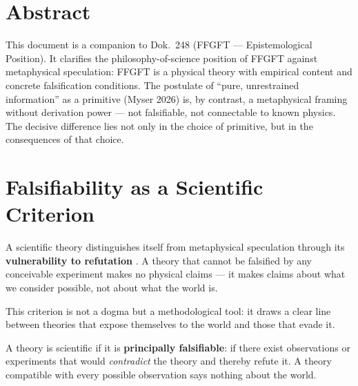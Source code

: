 
\section*{Abstract}

This document is a companion to Dok.~248 (FFGFT --- Epistemological Position). It clarifies the philosophy-of-science position of FFGFT against metaphysical speculation: FFGFT is a physical theory with empirical content and concrete falsification conditions. The postulate of ``pure, unrestrained information'' as a primitive (Myser 2026) is, by contrast, a metaphysical framing without derivation power --- not falsifiable, not connectable to known physics. The decisive difference lies not only in the choice of primitive, but in the consequences of that choice.

\tableofcontents
\newpage

\section{Falsifiability as a Scientific Criterion}

A scientific theory distinguishes itself from metaphysical speculation through its \textbf{vulnerability to refutation} \cite{Popper1934}. A theory that cannot be falsified by any conceivable experiment makes no physical claims --- it makes claims about what we consider possible, not about what the world is.

This criterion is not a dogma but a methodological tool: it draws a clear line between theories that expose themselves to the world and those that evade it.

\begin{keyresult}
A theory is scientific if it is \textbf{principally falsifiable}: if there exist observations or experiments that would \emph{contradict} the theory and thereby refute it. A theory compatible with every possible observation says nothing about the world.
\end{keyresult}

